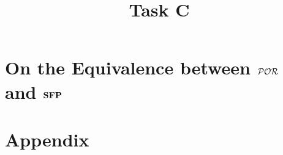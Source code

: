\documentclass[10pt, oneside]{article}
\title{\textbf{Task C}}
\author{}
\begin{document}
\maketitle


\section{{On the Equivalence between $\mathcal{POR}$ and $\mathbf{SFP}$}}\label{sec:TaskC}








\newpage
\section*{Appendix}

%

%



\newpage


\end{document}
